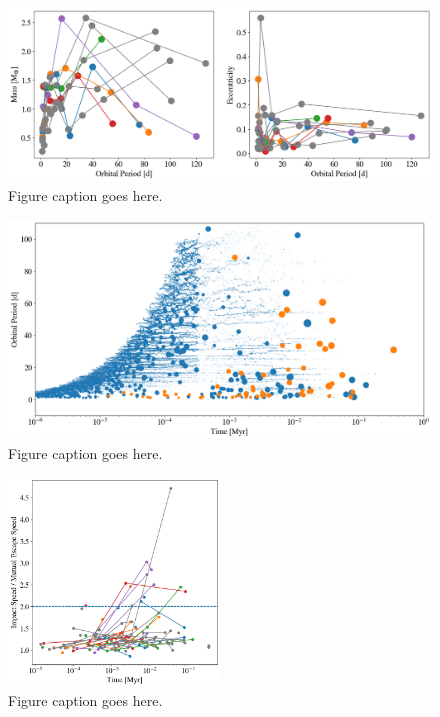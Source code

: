 \begin{figure}
\begin{center}
    \includegraphics[width=\textwidth]{figures/stip/per_mass_ecc_iso_comp.png}
    \caption{Figure caption goes here.\label{fig:per_mass_ecc_iso_comp}}
\end{center}
\end{figure}

\begin{figure}
\begin{center}
    \includegraphics[width=\textwidth]{figures/stip/full_coll_iso_comp.png}
    \caption{Figure caption goes here.\label{fig:full_coll_iso_comp}}
\end{center}
\end{figure}

\begin{figure}
\begin{center}
    \includegraphics[width=0.5\textwidth]{figures/stip/impact_iso_comp.png}
    \caption{Figure caption goes here.\label{fig:impact_iso_comp}}
\end{center}
\end{figure}

